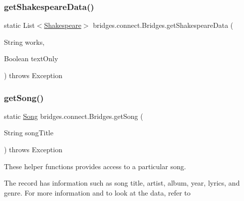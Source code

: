 \mbox{\label{classbridges_1_1connect_1_1_bridges_aa81c312e631bc76fa49e0ccae66679dc}} 
\subsubsection{\texorpdfstring{get\+Shakespeare\+Data()}{getShakespeareData()}\hspace{0.1cm}{\footnotesize\ttfamily [3/3]}}
{\footnotesize\ttfamily static List$<$\mbox{\hyperlink{classbridges_1_1data__src__dependent_1_1_shakespeare}{Shakespeare}}$>$ bridges.\+connect.\+Bridges.\+get\+Shakespeare\+Data (\begin{DoxyParamCaption}\item[{String}]{works,  }\item[{Boolean}]{text\+Only }\end{DoxyParamCaption}) throws Exception\hspace{0.3cm}{\ttfamily [static]}}

\mbox{\label{classbridges_1_1connect_1_1_bridges_a7f65e6648f9e66a02343a39f2fc425cb}} 
\subsubsection{\texorpdfstring{get\+Song()}{getSong()}\hspace{0.1cm}{\footnotesize\ttfamily [1/2]}}
{\footnotesize\ttfamily static \mbox{\hyperlink{classbridges_1_1data__src__dependent_1_1_song}{Song}} bridges.\+connect.\+Bridges.\+get\+Song (\begin{DoxyParamCaption}\item[{String}]{song\+Title }\end{DoxyParamCaption}) throws Exception\hspace{0.3cm}{\ttfamily [static]}}

These helper functions provides access to a particular song.

The record has information such as song title, artist, album, year, lyrics, and genre. For more information and to look at the data, refer to 

